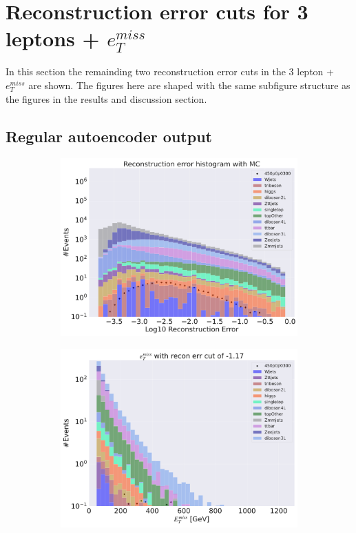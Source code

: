 \section{Reconstruction error cuts for 3 leptons + $e_T^{miss}$}

In this section the remainding two reconstruction error cuts in the 3 lepton + $e_T^{miss}$ are shown. 
The figures here are shaped with the same subfigure structure as the figures in the results and 
discussion section. 
\subsection*{Regular autoencoder output}
\begin{figure}[H]
    \centering
    \begin{subfigure}{.40\textwidth}
        \includegraphics[width=\textwidth]{Figures/AE_testing/big/3lep/b_data_recon_big_rm3_feats_sig_450p0p0300.pdf}
        \caption{ }
        \label{fig:AE_3lep_big_450_2}
    \end{subfigure}
    \hfill
    \begin{subfigure}{.40\textwidth}
        \includegraphics[width=\textwidth]{Figures/AE_testing/big/3lep/b_data_recon_big_rm3_feats_sig_450p0p0300_etmiss_recon_errcut_-1.17.pdf}

\end{subfigure}
\end{figure}
